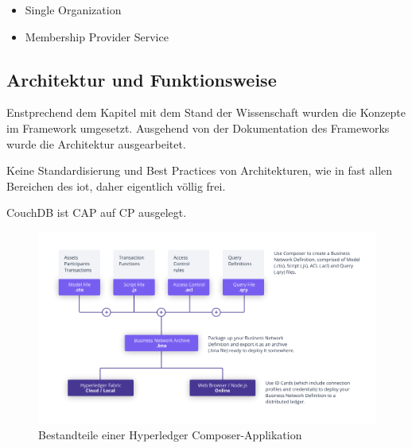         \begin{itemize}[noitemsep]
            \item Single Organization 
            \item Membership Provider Service
        \end{itemize}
    
\subsection{Architektur und Funktionsweise}
\label{sec:prototype_arch}
    Enstprechend dem Kapitel mit dem Stand der Wissenschaft wurden die Konzepte im Framework umgesetzt.
    Ausgehend von der Dokumentation des Frameworks \cite{ComposerDocs} wurde die Architektur ausgearbeitet. 
    
    Keine Standardisierung und Best Practices von Architekturen, wie in fast allen Bereichen des \gls{iot}, daher eigentlich völlig frei.
    
    CouchDB ist CAP auf CP ausgelegt.
    
    \begin{figure}[H]
		\centering
		\includegraphics[width=\textwidth]{graphics/Composer-Diagram.png}
		\caption[Bestandteile einer Hyperledger Composer-Applikation]{Bestandteile einer Hyperledger Composer-Applikation\cite{ComposerDocs}}
		\label{fig:composer_arch}
	\end{figure}
    
